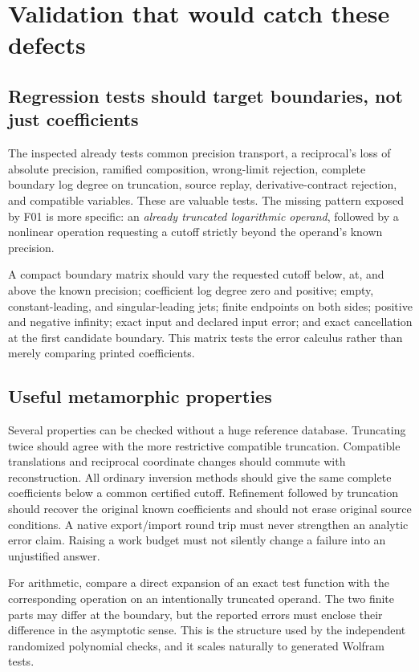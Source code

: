 \documentclass[11pt,letterpaper]{article}
\newcommand{\code}[1]{\texttt{\small\detokenize{#1}}}
\begin{document}
\section{Validation that would catch these defects}
\label{sec:testing}
\subsection{Regression tests should target boundaries, not just coefficients}
The inspected \code{SeriesOperations.wlt} already tests common precision transport, a reciprocal's loss of absolute precision, ramified composition, wrong-limit rejection, complete boundary log degree on truncation, source replay, derivative-contract rejection, and compatible variables. These are valuable tests. The missing pattern exposed by F01 is more specific: an \emph{already truncated logarithmic operand}, followed by a nonlinear operation requesting a cutoff strictly beyond the operand's known precision.\cite{repo-tests}

A compact boundary matrix should vary the requested cutoff below, at, and above the known precision; coefficient log degree zero and positive; empty, constant-leading, and singular-leading jets; finite endpoints on both sides; positive and negative infinity; exact input and declared input error; and exact cancellation at the first candidate boundary. This matrix tests the error calculus rather than merely comparing printed coefficients.

\subsection{Useful metamorphic properties}
Several properties can be checked without a huge reference database. Truncating twice should agree with the more restrictive compatible truncation. Compatible translations and reciprocal coordinate changes should commute with reconstruction. All ordinary inversion methods should give the same complete coefficients below a common certified cutoff. Refinement followed by truncation should recover the original known coefficients and should not erase original source conditions. A native export/import round trip must never strengthen an analytic error claim. Raising a work budget must not silently change a failure into an unjustified answer.

For arithmetic, compare a direct expansion of an exact test function with the corresponding operation on an intentionally truncated operand. The two finite parts may differ at the boundary, but the reported errors must enclose their difference in the asymptotic sense. This is the structure used by the independent randomized polynomial checks, and it scales naturally to generated Wolfram tests.
\end{document}
